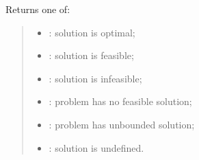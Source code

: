 \documentclass[letterpaper,12pt,english]{sphinxmanual}
\begin{document}
\begin{fulllineitems}
\label{\detokenize{api/solvers:cbmpy.CBGLPK.glpk_getSolutionStatus}}
\pysigstartsignatures
\pysiglinewithargsret
{}
{}
{}
\pysigstopsignatures
\sphinxAtStartPar
Returns one of:
\begin{quote}\begin{description}
\begin{itemize}
\item {} 
\sphinxAtStartPar
{} \textendash{} : solution is optimal;

\item {} 
\sphinxAtStartPar
{} \textendash{} : solution is feasible;

\item {} 
\sphinxAtStartPar
{} \textendash{} : solution is infeasible;

\item {} 
\sphinxAtStartPar
{} \textendash{} : problem has no feasible solution;

\item {} 
\sphinxAtStartPar
{} \textendash{} : problem has unbounded solution;

\item {} 
\sphinxAtStartPar
{} \textendash{} : solution is undefined.

\end{itemize}

\end{description}\end{quote}

\end{fulllineitems}

\end{document}
